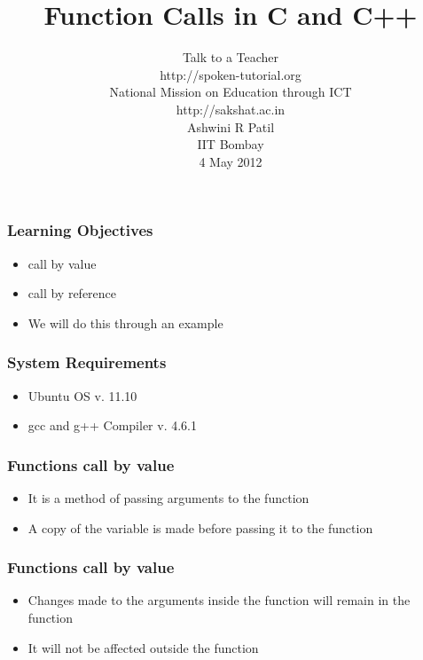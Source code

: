 \documentclass[17pt]{beamer}
\begin{document}
\sffamily \bfseries
\title
[Function Calls in C and C++ \hspace{0.75cm}]
{Function Calls in C and C++}
\author
[Ashwini R Patil]
{\small Talk to a Teacher \\http://spoken-tutorial.org \\ National Mission on Education
  through ICT \\ http://sakshat.ac.in \\ [0.6cm]
   Ashwini R Patil \\IIT Bombay \\[0.6cm]
{\small 4 May 2012}
}
\begin{frame}
   \titlepage
\end{frame}
\begin{frame}[fragile]
  \frametitle{Learning Objectives}\pause
  \begin{itemize}[<+-|alert@+>]
  \item call by value
\item call by reference
\item We will do this through an example
  \end{itemize}
\end{frame}
\begin{frame}
  \frametitle {System Requirements} \pause
  \begin{itemize}[<+-|alert@+>]
  \item Ubuntu OS v. 11.10
  \item gcc and g++ Compiler v. 4.6.1
  \end{itemize}
\end{frame}

\begin{frame}
  \frametitle{Functions call by value}\pause
  \begin{itemize}[<+-|alert@+>]
  \item It is a method of passing arguments to the function
\item A copy of the variable is made before passing it to the function  
  \end{itemize}
\end{frame}

\begin{frame}
  \frametitle{Functions call by value}\pause
  \begin{itemize}[<+-|alert@+>]
\item Changes made to the arguments inside the function will remain in the function
\item It will not be affected outside the function
  \end{itemize}
\end{frame}
\end{document}
